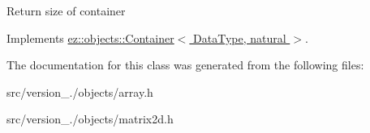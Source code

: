 Return size of container 

Implements \hyperlink{classez_1_1objects_1_1Container_affd294810c6c29530d1d1e3c2151ad28}{ez\+::objects\+::\+Container$<$ Data\+Type, natural $>$}.



The documentation for this class was generated from the following files\+:\begin{DoxyCompactItemize}
\item 
src/version\+\_./objects/array.\+h\item 
src/version\+\_./objects/matrix2d.\+h\end{DoxyCompactItemize}
